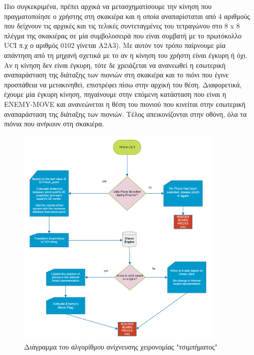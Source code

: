 Πιο συγκεκριμένα, πρέπει αρχικά να μετασχηματίσουμε την κίνηση που πραγματοποίησε ο χρήστης στη σκακιέρα και η οποία αναπαρίσταται από 4 αριθμούς που δείχνουν τις αρχικές και τις τελικές συντεταγμένες του τετραγώνου στο 8 x 8 πλέγμα της σκακιέρας σε μία συμβολοσειρά που είναι συμβατή με το πρωτόκολλο UCI π.χ ο αριθμός 0102 γίνεται A2A3). Με αυτόν τον τρόπο παίρνουμε μία απάντηση από τη μηχανή σχετικά με το αν η κίνηση του χρήστη είναι έγκυρη ή όχι. 
Αν η κίνηση δεν είναι έγκυρη, τότε δε χρειάζεται να ανανεωθεί η εσωτερική αναπαράσταση της διάταξης των πιονιών στη σκακιέρα και το πιόνι που έγινε προσπάθεια να μετακινηθεί, επιστρέφει πίσω στην αρχική του θέση. Διαφορετικά, έχουμε μία έγκυρη κίνηση, πηγαίνουμε στην επόμενη κατάσταση που είναι η ENEMY-MOVE και ανανεώνεται η θέση του πιονιού που κινείται στην εσωτερική αναπαράσταση της διάταξης των πιονιών. Τέλος απεικονίζονται στην οθόνη, όλα τα πιόνια που ανήκουν στη σκακιέρα.


\begin{figure}[H]
    \centering
    \includegraphics[width=0.9\textwidth]{Files/Figures/pinch_out.png}
    \caption[Διάγραμμα του αλγορίθμου ανίχνευσης χειρονομίας "τσιμπήματος"]{Διάγραμμα του αλγορίθμου ανίχνευσης χειρονομίας "τσιμπήματος"}
    \label{fig:gesture_rec}
\end{figure}



